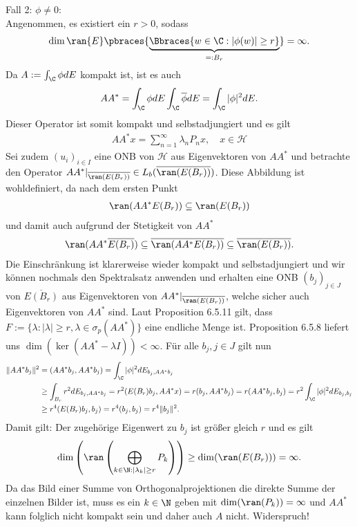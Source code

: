 \begin{solution}
Fall 2: $\phi \neq 0:$ \\
Angenommen, es existiert ein $r > 0$, sodass
\begin{align*}
  \dim{\ran{E}}\pbraces{\underbrace{\Bbraces{w \in \C:|\phi(w)| \geq r}}_{=: B_r}} = \infty.
\end{align*}
Da $A := \int_{\C} \phi dE$ kompakt ist, ist es auch
\begin{align*}
  AA^* = \int_{\C} \phi dE\int_{\C} \overline{\phi} dE = \int_{\C} |\phi|^2 dE.
\end{align*}
Dieser Operator ist somit kompakt und selbstadjungiert und es gilt
\begin{align*}
  AA^*x = \sum_{n=1}^{\infty}\lambda_nP_nx, \quad x \in \mathcal{H}
\end{align*}
Sei zudem $(u_i)_{i \in I}$ eine ONB von $\mathcal{H}$ aus Eigenvektoren von $AA^*$
und betrachte den Operator $AA^*|_{\overline{\ran(E(B_r))}} \in L_b({\overline{\ran(E(B_r))}})$.
Diese Abbildung ist wohldefiniert, da nach dem ersten Punkt
\begin{align*}
  \ran(AA^*E(B_r)) \subseteq \ran(E(B_r))
\end{align*}
und damit auch aufgrund der Stetigkeit von $AA^*$
\begin{align*}
  \ran(AA^*\overline{E(B_r)}) \subseteq \overline{\ran(AA^*E(B_r))} \subseteq \overline{\ran(E(B_r))}.
\end{align*}
Die Einschränkung ist klarerweise wieder kompakt und selbstadjungiert und wir können
nochmals den Spektralsatz anwenden und erhalten eine ONB $(b_j)_{j \in J}$ von $\overline{E(B_r)}$
aus Eigenvektoren von $AA^*|_{\overline{\ran(E(B_r))}}$, welche sicher
auch Eigenvektoren von $AA^*$ sind.
Laut Proposition 6.5.11 gilt, dass
$F := \{\lambda: |\lambda| \geq r, \lambda \in \sigma_p(AA^*)\}$ eine endliche Menge
ist.
Proposition 6.5.8 liefert uns $\dim(\ker(AA^* -\lambda I)) < \infty$.
Für alle $b_j,j \in J$ gilt nun
\begin{align*}
  \|AA^*b_j\|^2 &= (AA^*b_j,AA^*b_j) = \int_{\C}|\phi|^2 dE_{b_j,AA^*b_j} \\
   &\geq \int_{B_r}r^2 dE_{b_j,AA^*b_j} = r^2(E(B_r)b_j,AA^*x) = r(b_j,AA^*b_j) = r(AA^*b_j,b_j) = r^2\int_{\C}|\phi|^2 dE_{b_j,b_j} \\
    &\geq r^4(E(B_r)b_j,b_j) = r^4(b_j,b_j) = r^4\|b_j\|^2.
\end{align*}
Damit gilt: Der zugehörige Eigenwert zu $b_j$ ist größer gleich $r$ und es gilt
\begin{align*}
  \dim\left(\ran\left(\bigoplus_{k \in \N: |\lambda_k| \geq r}P_k\right)\right) \geq \dim(\ran(E(B_r))) = \infty.
\end{align*}
Da das Bild einer Summe von Orthogonalprojektionen die direkte Summe der
einzelnen Bilder ist, muss es ein $k \in \N$ geben mit $\dim(\ran(P_k)) = \infty$ und $AA^*$ kann folglich nicht
kompakt sein und daher auch $A$ nicht. Widerspruch!
\end{solution}
